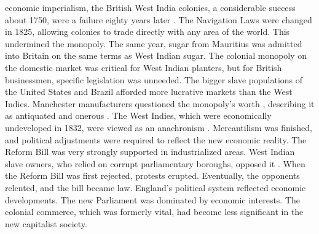 economic imperialism, the British West India colonies, a considerable success about 1750, were a failure eighty years later . The Navigation Laws were changed in 1825, allowing colonies to trade directly with any area of the world. This undermined the monopoly. The same year, sugar from Mauritius was admitted into Britain on the same terms as West Indian sugar. The colonial monopoly on the domestic market was critical for West Indian planters, but for British businessmen, specific legislation was unneeded. The bigger slave populations of the United States and Brazil afforded more lucrative markets than the West Indies.  Manchester manufacturers questioned the monopoly's worth , describing it as antiquated and onerous . The West Indies, which were economically undeveloped in 1832, were viewed as an anachronism . Mercantilism was finished, and political adjustments were required to reflect the new economic reality. The Reform Bill was very strongly supported in industrialized areas. West Indian slave owners, who relied on corrupt parliamentary boroughs, opposed it . When the Reform Bill was first rejected, protests erupted. Eventually, the opponents relented, and the bill became law. England's political system reflected economic developments. The new Parliament was dominated by economic interests. The colonial commerce, which was formerly vital, had become less significant in the new capitalist society.